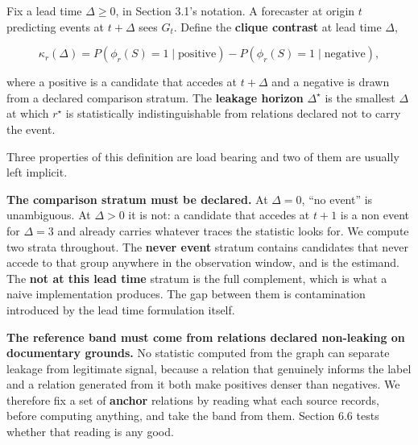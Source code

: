 \documentclass[twoside,11pt]{article}
\begin{document}
Fix a lead time \(\Delta \geq 0\), in Section 3.1's notation. A forecaster at origin \(t\) predicting events at \(t + \Delta\) sees \(G_{t}\). Define the \textbf{clique contrast} at lead time \(\Delta\),

\[\kappa_{r}(\Delta) = P\left( \phi_{r}(S) = 1 \mid \text{positive} \right) - P\left( \phi_{r}(S) = 1 \mid \text{negative} \right),\]

where a positive is a candidate that accedes at \(t + \Delta\) and a negative is drawn from a declared comparison stratum. The \textbf{leakage horizon} \(\Delta^{\star}\) is the smallest \(\Delta\) at which \(r^{\star}\) is statistically indistinguishable from relations declared not to carry the event.

Three properties of this definition are load bearing and two of them are usually left implicit.

\textbf{The comparison stratum must be declared.} At \(\Delta = 0\), ``no event'' is unambiguous. At \(\Delta > 0\) it is not: a candidate that accedes at \(t + 1\) is a non event for \(\Delta = 3\) and already carries whatever traces the statistic looks for. We compute two strata throughout. The \textbf{never event} stratum contains candidates that never accede to that group anywhere in the observation window, and is the estimand. The \textbf{not at this lead time} stratum is the full complement, which is what a naive implementation produces. The gap between them is contamination introduced by the lead time formulation itself.

\textbf{The reference band must come from relations declared non-leaking on documentary grounds.} No statistic computed from the graph can separate leakage from legitimate signal, because a relation that genuinely informs the label and a relation generated from it both make positives denser than negatives. We therefore fix a set of \textbf{anchor} relations by reading what each source records, before computing anything, and take the band from them. Section 6.6 tests whether that reading is any good.
\end{document}
